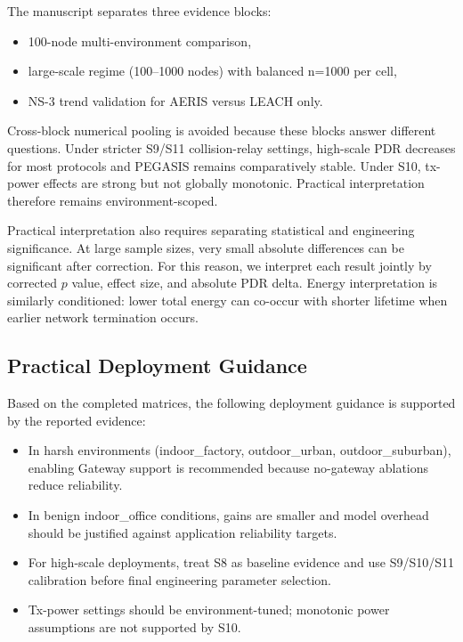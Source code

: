 \documentclass[sensors,article,submit,moreauthors,pdftex]{Definitions/mdpi}
\begin{document}
The manuscript separates three evidence blocks:
\begin{itemize}
\item 100-node multi-environment comparison,
\item large-scale regime (100--1000 nodes) with balanced n=1000 per cell,
\item NS-3 trend validation for AERIS versus LEACH only.
\end{itemize}
Cross-block numerical pooling is avoided because these blocks answer different questions. Under stricter S9/S11 collision-relay settings, high-scale PDR decreases for most protocols and PEGASIS remains comparatively stable. Under S10, tx-power effects are strong but not globally monotonic. Practical interpretation therefore remains environment-scoped.

Practical interpretation also requires separating statistical and engineering significance. At large sample sizes, very small absolute differences can be significant after correction. For this reason, we interpret each result jointly by corrected $p$ value, effect size, and absolute PDR delta. Energy interpretation is similarly conditioned: lower total energy can co-occur with shorter lifetime when earlier network termination occurs.

\subsection*{Practical Deployment Guidance}
Based on the completed matrices, the following deployment guidance is supported by the reported evidence:
\begin{itemize}
\item In harsh environments (indoor\_factory, outdoor\_urban, outdoor\_suburban), enabling Gateway support is recommended because no-gateway ablations reduce reliability.
\item In benign indoor\_office conditions, gains are smaller and model overhead should be justified against application reliability targets.
\item For high-scale deployments, treat S8 as baseline evidence and use S9/S10/S11 calibration before final engineering parameter selection.
\item Tx-power settings should be environment-tuned; monotonic power assumptions are not supported by S10.
\end{itemize}
\end{document}
